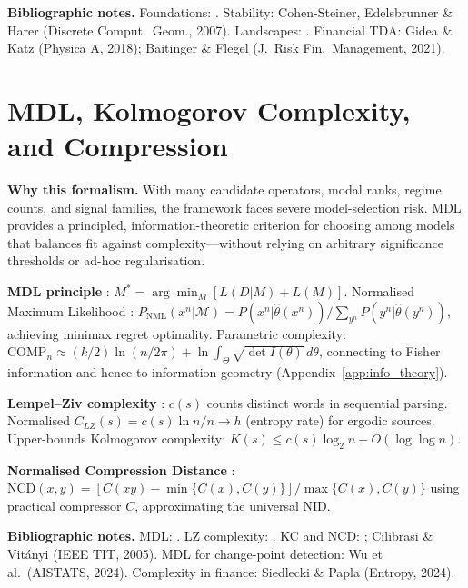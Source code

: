 \documentclass[11pt,a4paper]{article}
\theoremstyle{definition}
\begin{document}
\begin{appendices}
\textbf{Bibliographic notes.} Foundations: \citet{carlsson2009topology,edelsbrunner2010computational}. Stability: Cohen-Steiner, Edelsbrunner \& Harer (Discrete Comput.\ Geom., 2007). Landscapes: \citet{bubenik2015statistical}. Financial TDA: Gidea \& Katz (Physica A, 2018); Baitinger \& Flegel (J.\ Risk Fin.\ Management, 2021).


\section{MDL, Kolmogorov Complexity, and Compression}
\label{app:mdl}

\textbf{Why this formalism.} With many candidate operators, modal ranks, regime counts, and signal families, the framework faces severe model-selection risk. MDL provides a principled, information-theoretic criterion for choosing among models that balances fit against complexity---without relying on arbitrary significance thresholds or ad-hoc regularisation.

\textbf{MDL principle} \citep{rissanen1978modeling}: $M^* = \arg\min_M [L(D|M) + L(M)]$. Normalised Maximum Likelihood \citep{grunwald2007minimum}: $P_{\mathrm{NML}}(x^n|\mathcal{M}) = P(x^n|\hat{\theta}(x^n))/\sum_{y^n}P(y^n|\hat{\theta}(y^n))$, achieving minimax regret optimality. Parametric complexity: $\mathrm{COMP}_n \approx (k/2)\ln(n/2\pi) + \ln\int_\Theta\sqrt{\det I(\theta)}\,d\theta$, connecting to Fisher information and hence to information geometry (Appendix~\ref{app:info_theory}).

\textbf{Lempel--Ziv complexity} \citep{lempel1976complexity}: $c(s)$ counts distinct words in sequential parsing. Normalised $C_{LZ}(s) = c(s)\ln n/n \to h$ (entropy rate) for ergodic sources. Upper-bounds Kolmogorov complexity: $K(s) \leq c(s)\log_2 n + O(\log\log n)$.

\textbf{Normalised Compression Distance} \citep{li2008introduction}: $\mathrm{NCD}(x,y) = [C(xy) - \min\{C(x),C(y)\}]/\max\{C(x),C(y)\}$ using practical compressor $C$, approximating the universal NID.

\textbf{Bibliographic notes.} MDL: \citet{rissanen1978modeling,grunwald2007minimum}. LZ complexity: \citet{lempel1976complexity}. KC and NCD: \citet{li2008introduction}; Cilibrasi \& Vit\'{a}nyi (IEEE TIT, 2005). MDL for change-point detection: Wu et al.\ (AISTATS, 2024). Complexity in finance: Siedlecki \& Papla (Entropy, 2024).



\end{appendices}
\end{document}
